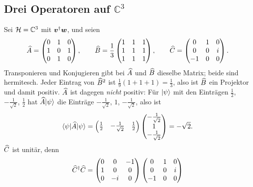 \subsection{Drei Operatoren auf \texorpdfstring{$\mathbb{C}^3$}{C3}}
\begin{beispiel}
	Sei $\mathcal{H} = \mathbb{C}^3$ mit $\boldsymbol{v}^{\dagger}\boldsymbol{w}$, und seien
	\begin{equation}
		\widehat{A} = \begin{pmatrix} 0 & 1 & 0 \\ 1 & 0 & 1 \\ 0 & 1 & 0 \end{pmatrix}, \qquad
		\widehat{B} = \frac13\begin{pmatrix} 1 & 1 & 1 \\ 1 & 1 & 1 \\ 1 & 1 & 1 \end{pmatrix}, \qquad
		\widehat{C} = \begin{pmatrix} 0 & 1 & 0 \\ 0 & 0 & i \\ -1 & 0 & 0 \end{pmatrix}.
	\end{equation}
	Transponieren und Konjugieren gibt bei $\widehat{A}$ und $\widehat{B}$ dieselbe Matrix; beide sind hermitesch. Jeder Eintrag von $\widehat{B}^2$ ist $\tfrac19(1 + 1 + 1) = \tfrac13$, also ist $\widehat{B}$ ein Projektor und damit positiv. $\widehat{A}$ ist dagegen \emph{nicht} positiv: Für $\lvert \psi \rangle$ mit den Einträgen $\tfrac12$, $-\tfrac{1}{\sqrt{2}}$, $\tfrac12$ hat $\widehat{A}\lvert \psi \rangle$ die Einträge $-\tfrac{1}{\sqrt{2}}$, $1$, $-\tfrac{1}{\sqrt{2}}$, also ist
	\begin{equation}
		\langle \psi \rvert \widehat{A} \lvert \psi \rangle
		= \begin{pmatrix} \frac12 & -\frac{1}{\sqrt{2}} & \frac12 \end{pmatrix}
		  \begin{pmatrix} - \frac{1}{\sqrt{2}} \\ 1 \\ -\frac{1}{\sqrt{2}} \end{pmatrix}
		= -\sqrt{2}.
	\end{equation}
	$\widehat{C}$ ist unitär, denn
	\begin{equation}
		\op{C}\adj\op{C}
		= \begin{pmatrix} 0 & 0 & -1 \\ 1 & 0 & 0 \\ 0 & -i & 0 \end{pmatrix}
		  \begin{pmatrix} 0 & 1 & 0 \\ 0 & 0 & i \\ -1 & 0 & 0 \end{pmatrix}

\end{equation}
\end{beispiel}
